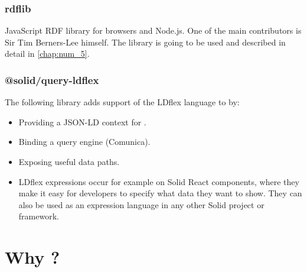 \subsubsection{rdflib}

JavaScript RDF library for browsers and Node.js. One of the main contributors is Sir Tim Berners-Lee himself. The library is going to be used and described in detail in \autoref{chap:num_5}.

\subsubsection{@solid/query-ldflex}

The following library adds support of the LDflex language to \solid{} by:

\begin{itemize}
	\item Providing a JSON-LD context for \solid{}.
    \item Binding a query engine (Comunica).
    \item Exposing useful data paths.
    \item LDflex expressions occur for example on Solid React components, where they make it easy for developers to specify what data they want to show. They can also be used as an expression language in any other Solid project or framework.
\end{itemize}

\section{Why \solid{}?}
\label{sssec:why_solid}

